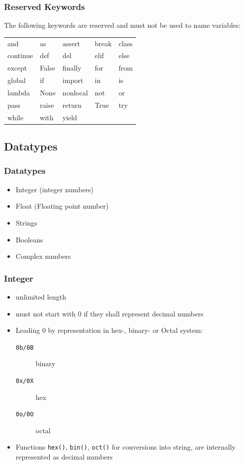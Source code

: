 \documentclass[english]{beamer}
\begin{document}
\begin{frame}
\frametitle{Reserved Keywords}

The following  keywords are reserved and must not be used to name variables:

\begin{center}
\begin{tabular}{p{}p{}p{}p{}p{}}
and	&	as	&	assert	&	break	&	class	\\
continue	&	def	&	del	&	elif	&	else	\\
except	&	False	&	finally	&	for	&	from	\\
global	&	if	&	import	&	in	&	is	\\
lambda	&	None	&	nonlocal	&	not	&	or	\\
pass	&	raise	&	return	&	True	&	try	\\
while	&	with	&	yield	&		&		\\
\end{tabular}
\end{center}
\end{frame}



\subsection{Datatypes}

\begin{frame}
\frametitle{Datatypes}


\begin{itemize}
\item Integer (integer numbers)
\item Float (Floating point number)
\item Strings
\item Booleans
\item Complex numbers
\end{itemize}
\end{frame}

\begin{frame}
\frametitle{Integer}

\begin{itemize}
\item unlimited length
\item must not start with 0 if they shall represent decimal numbers 
\item Leading 0 by representation in hex-, binary- or Octal system:
\begin{description}
\item[\texttt{0b/0B}] binary
\item[\texttt{0x/0X}] hex
\item[\texttt{0o/0O}] octal
\end{description}
\item Functions \texttt{hex()}, \texttt{bin()}, \texttt{oct()} for conversions into string, are internally represented as decimal numbers 
\end{itemize}
\end{frame}
\end{document}
